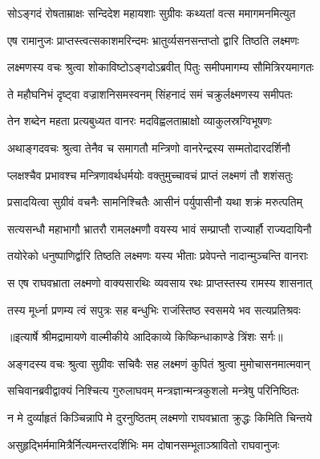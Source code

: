 \twolineshloka
{सोऽङ्गदं रोषताम्राक्षः सन्दिदेश महायशाः}
{सुग्रीवः कथ्यतां वत्स ममागमनमित्युत} %

\twolineshloka
{एष रामानुजः प्राप्तस्त्वत्सकाशमरिन्दमः}
{भ्रातुर्व्यसनसन्तप्तो द्वारि तिष्ठति लक्ष्मणः} %

\twolineshloka
{लक्ष्मणस्य वचः श्रुत्वा शोकाविष्टोऽङ्गदोऽब्रवीत्}
{पितुः समीपमागम्य सौमित्रिरयमागतः} %

\twolineshloka
{ते महौघनिभं दृष्ट्वा वज्राशनिसमस्वनम्}
{सिंहनादं समं चक्रुर्लक्ष्मणस्य समीपतः} %

\twolineshloka
{तेन शब्देन महता प्रत्यबुध्यत वानरः}
{मदविह्वलताम्राक्षो व्याकुलस्रग्विभूषणः} %

\twolineshloka
{अथाङ्गदवचः श्रुत्वा तेनैव च समागतौ}
{मन्त्रिणो वानरेन्द्रस्य सम्मतोदारदर्शिनौ} %

\twolineshloka
{प्लक्षश्चैव प्रभावश्च मन्त्रिणावर्थधर्मयोः}
{वक्तुमुच्चावचं प्राप्तं लक्ष्मणं तौ शशंसतुः} %

\twolineshloka
{प्रसादयित्वा सुग्रीवं वचनैः सामनिश्चितैः}
{आसीनं पर्युपासीनौ यथा शक्रं मरुत्पतिम्} %

\twolineshloka
{सत्यसन्धौ महाभागौ भ्रातरौ रामलक्ष्मणौ}
{वयस्य भावं सम्प्राप्तौ राज्यार्हौ राज्यदायिनौ} %

\twolineshloka
{तयोरेको धनुष्पाणिर्द्वारि तिष्ठति लक्ष्मणः}
{यस्य भीताः प्रवेपन्ते नादान्मुञ्चन्ति वानराः} %

\twolineshloka
{स एष राघवभ्राता लक्ष्मणो वाक्यसारथिः}
{व्यवसाय रथः प्राप्तस्तस्य रामस्य शासनात्} %

\twolineshloka
{तस्य मूर्ध्ना प्रणम्य त्वं सपुत्रः सह बन्धुभिः}
{राजंस्तिष्ठ स्वसमये भव सत्यप्रतिश्रवः} %


{॥इत्यार्षे श्रीमद्रामायणे वाल्मीकीये आदिकाव्ये किष्किन्धाकाण्डे त्रिंशः सर्गः॥}


\twolineshloka
{अङ्गदस्य वचः श्रुत्वा सुग्रीवः सचिवैः सह}
{लक्ष्मणं कुपितं श्रुत्वा मुमोचासनमात्मवान्} %

\twolineshloka
{सचिवानब्रवीद्वाक्यं निश्चित्य गुरुलाघवम्}
{मन्त्रज्ञान्मन्त्रकुशलो मन्त्रेषु परिनिष्ठितः} %

\twolineshloka
{न मे दुर्व्याहृतं किञ्चिन्नापि मे दुरनुष्ठितम्}
{लक्ष्मणो राघवभ्राता क्रुद्धः किमिति चिन्तये} %

\twolineshloka
{असुहृद्भिर्ममामित्रैर्नित्यमन्तरदर्शिभिः}
{मम दोषानसम्भूताञ्श्रावितो राघवानुजः} %

